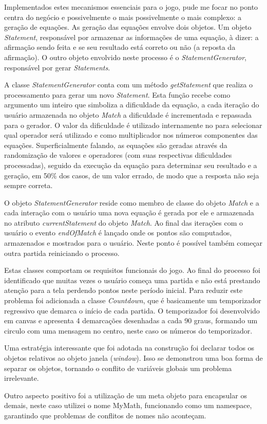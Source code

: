 \begin{draft}
Implementados estes mecanismos essenciais para o jogo, pude me focar no
ponto centra do negócio e possivelmente o mais possivelmente o mais
complexo: a geração de equações. As geração das equações envolve
dois objetos. Um objeto \textit{Statement}, responsável por armazenar
as informações de uma equação, à dizer: a afirmação sendo feita e
se seu resultado está correto ou não (a reposta da afirmação).
O outro objeto envolvido neste processo é o \textit{StatementGenerator},
responsável por gerar \textit{Statements}.

A classe \textit{StatementGenerator} conta com um método
\textit{getStatement} que realiza o processamento para gerar um novo
\textit{Statement}. Esta função recebe como argumento um inteiro que
simboliza a dificuldade da equação, a cada iteração do usuário
armazenada no objeto \textit{Match} a dificuldade é incrementada
e repassada para o gerador. O valor da dificuldade é utilizado
internamente no para selecionar qual operador será utilizado e como
multiplicador nos números componentes das equações. Superficialmente
falando, as equações são geradas através da randomização de
valores e operadores (com suas respectivas dificuldades processadas),
seguido da execução da equação para determinar seu resultado e a
geração, em 50\% dos casos, de um valor errado, de modo que a resposta
não seja sempre correta. 

O objeto \textit{StatementGenerator} reside como membro de classe
do objeto \textit{Match} e a cada interação com o usuário
uma nova equação é gerada por ele e armazenada no atributo
\textit{currentStatement} do objeto \textit{Match}. Ao final das iterações com
o usuário o evento \textit{endOfMatch} é lançado onde os pontos são
computados, armazenados e mostrados para o usuário. Neste ponto é
possível também começar outra partida reiniciando o processo.

Estas classes comportam os requisitos funcionais do jogo. Ao final
do processo foi identificado que muitas vezes o usuário começa uma
partida e não está prestando atenção para a tela perdendo pontos
neste período inicial. Para reduzir este problema foi adicionada 
a classe \textit{Countdown}, que é basicamente um temporizador regressivo que 
demarca o início de cada partida. O temporizador foi desenvolvido em canvas
e apresenta 4 demarcações desenhadas a cada 90 graus, formando um circulo com uma
mensagem no centro, neste caso os números do temporizador.

Uma estratégia interessante que foi adotada na construção foi
declarar todos os objetos relativos ao objeto janela (\textit{window}).
Isso se demonstrou uma boa forma de separar os objetos, tornando o
conflito de variáveis globais um problema irrelevante.

Outro aspecto positivo foi a utilização de um meta objeto para
encapsular os demais, neste caso utilizei o nome MyMath, funcionando
como um namespace, garantindo que problemas de conflitos de nomes não
aconteçam.

\end{draft}
